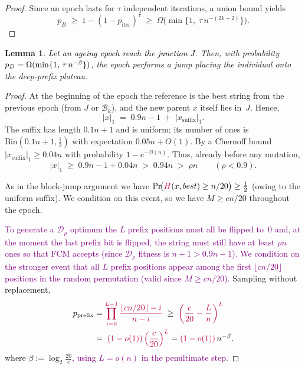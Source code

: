 \documentclass[lettersize,journal]{IEEEtran}
\newcommand{\new}[1]{\textcolor{black}{#1}}
\newcommand{\rerev}[1]{\textcolor{purple}{#1}}
\newtheorem{lemma}{Lemma}
\begin{document}
{\begin{proof}
Since an epoch lasts for \(\tau\) independent iterations, a union bound yields
	\[
	p_B
	\;\ge\;
	1-(1-p_{\text{iter}})^{\tau}
	\;\ge\;
	\Omega\!\bigl(\min\{1,\;\tau\,n^{-(2k+2)}\}\bigr).
	\]
	
	\noindent
\end{proof}


\setcounter{theorem}{13}
\begin{lemma} %
	\textcolor{black}{Let an ageing epoch reach the junction $J$.} Then, with probability $\new{p_D}=\Omega(\min\{1,\,\tau\,n^{-\beta}\})$, the epoch performs a jump placing the individual onto the deep-prefix plateau.
\end{lemma}

\begin{proof}
	At the beginning of the epoch the reference is the best string from the previous
	epoch (from $J$ or $\mathcal{B}_k$), and the new parent $x$ itself lies in~$J$.
	Hence,
	\[
	|x|_1\;=\;0.9n-1 \;+\; |x_{\text{suffix}}|_1.
	\]
	The suffix has length $0.1n+1$ and is uniform; its number of ones is
	$\mathrm{Bin}(0.1n+1,\tfrac12)$ with expectation $0.05n+O(1)$.
	By a Chernoff bound
	\(
	|x_{\text{suffix}}|_1\ge 0.04n
	\)
	with probability $1-e^{-\Omega(n)}$.
	Thus, already before any mutation,
	\[
	|x|_1
	\;\ge\;
	0.9n-1 + 0.04n
	\;>\;
	0.94n
	\;>\;
	\rho n
	\qquad(\rho<0.9).
	\tag{1}
	\]
	
As in the block-jump argument we have
	\(
	\Pr\!\bigl(\rerev{H}(x,best)\ge n/20\bigr)\ge\tfrac12
	\)
	(owing to the uniform suffix). We condition on this event, so we have
	 \(M\ge cn/20\) throughout the epoch.
	
\rerev{To generate a $\mathcal{D}_\rho$ optimum the $L$ prefix positions
	must all be flipped to~$0$ and, at the moment the last prefix bit is flipped,
	the string must still have at least $\rho n$ ones so that FCM accepts
	(since $\mathcal{D}_\rho$ fitness is $n+1>0.9n-1$).
	We condition on the stronger event that all $L$ prefix positions appear
	among the first $\lfloor cn/20\rfloor$ positions in the random permutation
	(valid since $M\ge cn/20$).}
	Sampling without replacement,
	\begin{align*}
		p_{\text{prefix}}
&=\rerev{\prod_{i=0}^{L-1}\frac{\lfloor cn/20\rfloor-i}{n-i}}
		\;\ge\;
		\rerev{\left(\frac{c}{20}-\frac{L}{n}\right)^{L}}
		\\ \;&=\;
		\rerev{(1-o(1))\left(\frac{c}{20}\right)^{L}}
		=\rerev{(1-o(1))\,}n^{-\beta}.
	\end{align*}
	where $\beta:=\log_{2}\frac{20}{c}$\rerev{, using $L=o(n)$ in the penultimate step}.
	

\end{proof}}
\end{document}
